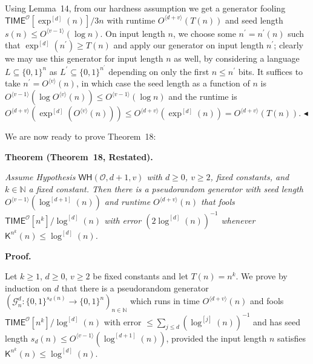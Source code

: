 Using Lemma 14, from our hardness assumption we get a generator fooling
${\mathsf{TIME}}^{\mathcal{O}}[\exp^{[d]}(n)]/3n$ with runtime $O^{\langle d+v\rangle}(T(n))$ and seed length $s(n)\leq O^{\langle v-1\rangle}(\log n)$.
On input length $n$, we choose some $n^{\prime}=n^{\prime}(n)$ such that $\exp^{[d]}(n^{\prime})\geq T(n)$ and apply our generator on input length $n^{\prime}$; clearly we may use this generator for input length $n$ as well, by considering a language $L\subseteq\{0,1\}^{n}$ as $L^{\prime}\subseteq\{0,1\}^{n^{\prime}}$ depending on only the first $n\leq n^{\prime}$ bits. It suffices to take $n^{\prime}=O^{\langle v\rangle}(n)$, in which case the seed length as a function of $n$ is $O^{\langle v-1\rangle}(\log O^{\langle v\rangle}(n))\leq O^{\langle v-1\rangle}(\log n)$ and the runtime is $O^{\langle d+v\rangle}(\exp^{[d]}(O^{\langle v\rangle}(n)))\leq O^{\langle d+v\rangle}(\exp^{[d]}(n))=O^{\langle d+v\rangle}(T(n))$.
$\blacktriangleleft$\par




We are now ready to prove Theorem 18:\par





\par\medskip\noindent\textbf{
\textbf{Theorem}\textbf{ }(Theorem 18, Restated)\textbf{.}
}\par



\emph{Assume Hypothesis $\mathsf{WH}(\mathcal{O},d+1,v)$ with $d\geq 0$, $v\geq 2$, fixed constants, and $k\in\mathbb{N}$ a fixed constant. Then there is a pseudorandom generator with seed length $O^{\langle v-1\rangle}(\log^{[d+1]}(n))$ and runtime $O^{\langle d+v\rangle}(n)$ that fools ${\mathsf{TIME}}^{\mathcal{O}}[n^{k}]/\log^{[d]}(n)$ with error $(2\log^{[d]}(n))^{-1}$ whenever ${\mathsf{K}}^{n^{k}}(n)\leq\log^{[d]}(n)$.}\par







\par\medskip\noindent\textbf{Proof.}\par




Let $k\geq 1$, $d\geq 0$, $v\geq 2$ be fixed constants and let $T(n)=n^{k}$.
We prove by induction on $d$ that there is a pseudorandom generator $(\mathcal{G}^{d}_{n}:\{0,1\}^{s_{d}(n)}\to\{0,1\}^{n})_{n\in\mathbb{N}}$ which runs in time $O^{\langle d+v\rangle}(n)$ and fools ${\mathsf{TIME}}^{\mathcal{O}}[n^{k}]/\log^{[d]}(n)$ with error $\leq\sum_{j\leq d}(\log^{[j]}(n))^{-1}$ and has seed length $s_{d}(n)\leq O^{\langle v-1\rangle}(\log^{[d+1]}(n))$, provided the input length $n$ satisfies ${\mathsf{K}}^{n^{k}}(n)\leq\log^{[d]}(n)$.\par




